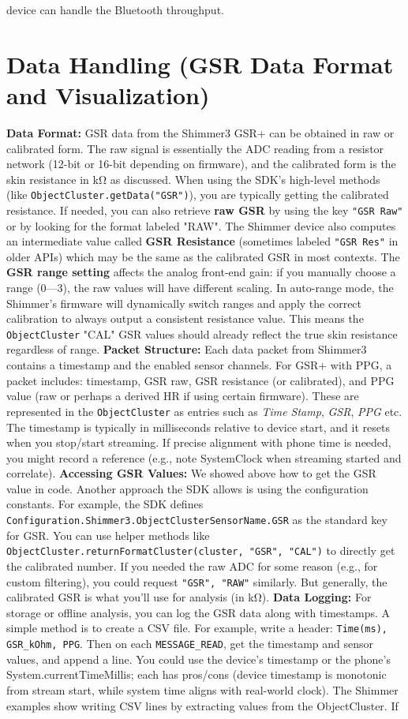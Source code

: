 device can handle the Bluetooth throughput. \section{Data Handling (GSR Data Format and Visualization)} \textbf{Data Format:} GSR data from the Shimmer3 GSR+ can be obtained in raw or calibrated form. The raw signal is essentially the ADC reading from a resistor network (12-bit or 16-bit depending on firmware), and the calibrated form is the skin resistance in kΩ as discussed. When using the SDK's high-level methods (like \texttt{ObjectCluster.getData("GSR")}), you are typically getting the calibrated resistance. If needed, you can also retrieve \textbf{raw GSR} by using the key \texttt{"GSR Raw"} or by looking for the format labeled "RAW". The Shimmer device also computes an intermediate value called \textbf{GSR Resistance} (sometimes labeled \texttt{"GSR Res"} in older APIs) which may be the same as the calibrated GSR in most contexts. The \textbf{GSR range setting} affects the analog front-end gain: if you manually choose a range (0---3), the raw values will have different scaling. In auto-range mode, the Shimmer's firmware will dynamically switch ranges and apply the correct calibration to always output a consistent resistance value. This means the \texttt{ObjectCluster} "CAL" GSR values should already reflect the true skin resistance regardless of range. \textbf{Packet Structure:} Each data packet from Shimmer3 contains a timestamp and the enabled sensor channels. For GSR+ with PPG, a packet includes: timestamp, GSR raw, GSR resistance (or calibrated), and PPG value (raw or perhaps a derived HR if using certain firmware). These are represented in the \texttt{ObjectCluster} as entries such as \textit{Time Stamp}, \textit{GSR}, \textit{PPG} etc. The timestamp is typically in milliseconds relative to device start, and it resets when you stop/start streaming. If precise alignment with phone time is needed, you might record a reference (e.g., note SystemClock when streaming started and correlate). \textbf{Accessing GSR Values:} We showed above how to get the GSR value in code. Another approach the SDK allows is using the configuration constants. For example, the SDK defines \texttt{Configuration.Shimmer3.ObjectClusterSensorName.GSR} as the standard key for GSR. You can use helper methods like \texttt{ObjectCluster.returnFormatCluster(cluster, "GSR", "CAL")} to directly get the calibrated number. If you needed the raw ADC for some reason (e.g., for custom filtering), you could request \texttt{"GSR", "RAW"} similarly. But generally, the calibrated GSR is what you'll use for analysis (in kΩ). \textbf{Data Logging:} For storage or offline analysis, you can log the GSR data along with timestamps. A simple method is to create a CSV file. For example, write a header: \texttt{Time(ms), GSR_kOhm, PPG}. Then on each \texttt{MESSAGE_READ}, get the timestamp and sensor values, and append a line. You could use the device's timestamp or the phone's System.currentTimeMillis; each has pros/cons (device timestamp is monotonic from stream start, while system time aligns with real-world clock). The Shimmer examples show writing CSV lines by extracting values from the ObjectCluster. If 